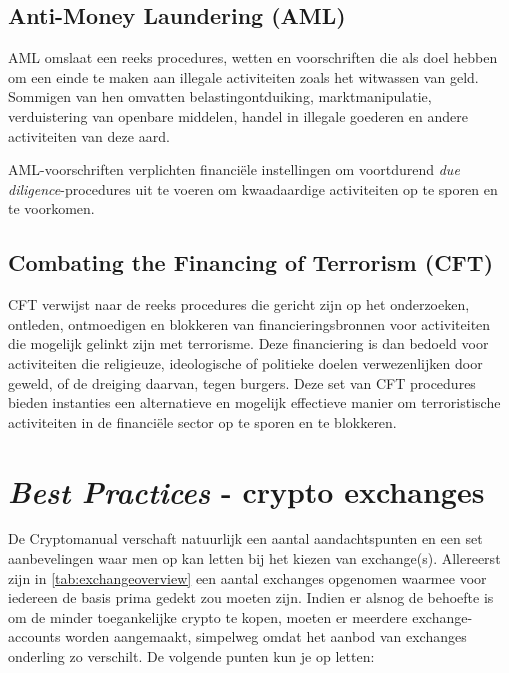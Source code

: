 \subsection*{Anti-Money Laundering (AML)}
AML omslaat een reeks procedures, wetten en voorschriften die als doel hebben om een einde te maken aan illegale activiteiten zoals het witwassen van geld. Sommigen van hen omvatten belastingontduiking, marktmanipulatie, verduistering van openbare middelen, handel in illegale goederen en andere activiteiten van deze aard.

AML-voorschriften verplichten financi{\"e}le instellingen om voortdurend \emph{due diligence}-procedures uit te voeren om kwaadaardige activiteiten op te sporen en te voorkomen.

\subsection*{Combating the Financing of Terrorism (CFT)}
CFT verwijst naar de reeks procedures die gericht zijn op het onderzoeken, ontleden, ontmoedigen en blokkeren van financieringsbronnen voor activiteiten die mogelijk gelinkt zijn met terrorisme. Deze financiering is dan bedoeld voor activiteiten die religieuze, ideologische of politieke doelen verwezenlijken door geweld, of de dreiging daarvan, tegen burgers. Deze set van CFT procedures bieden instanties een alternatieve en mogelijk effectieve manier om terroristische activiteiten in de financi{\"e}le sector op te sporen en te blokkeren.



\section{\emph{Best Practices} - crypto exchanges}
\label{sec:importantconsiderations}
De {\selectfont Cryptomanual}  verschaft natuurlijk een aantal aandachtspunten en een set aanbevelingen waar men op kan letten bij het kiezen van exchange(s). Allereerst zijn in \cref{tab:exchangeoverview} een aantal exchanges opgenomen waarmee voor iedereen de basis prima gedekt zou moeten zijn. Indien er alsnog de behoefte is om de minder toegankelijke crypto te kopen, moeten er meerdere exchange-accounts worden aangemaakt, simpelweg omdat het aanbod van exchanges onderling zo verschilt. De volgende punten kun je op letten:


